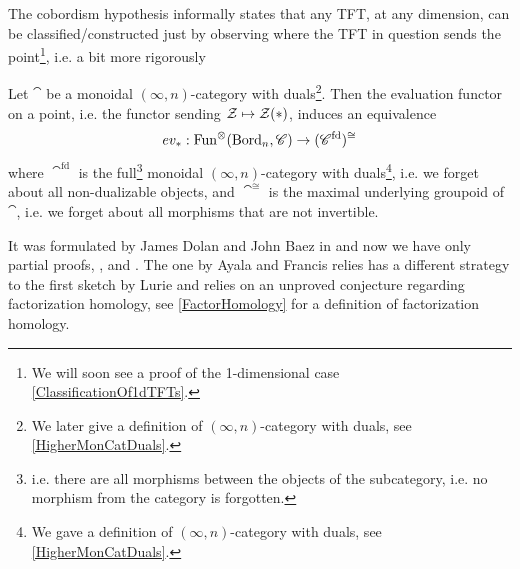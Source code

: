 \begin{rem}\label{RemarkOnCobHypo}
 The cobordism hypothesis informally states that any TFT, at any dimension, can be classified/constructed just by observing where the TFT in question sends the point\footnote{We will soon see a proof of the 1-dimensional case \ref{ClassificationOf1dTFTs}.}, i.e. a bit more rigorously
    \begin{thm}
        Let $\cat$ be a monoidal $(\infty,n)$-category with duals\footnote{We later give a definition of $(\infty,n)$-category with duals, see \ref{HigherMonCatDuals}.}. Then the evaluation functor on a point, i.e. the functor sending $\mathcal{Z}\mapsto \mathcal{Z}(\ast)$, induces an equivalence 
        $$ev_{\ast}:\operatorname{Fun}^{\otimes}(\operatorname{Bord}_{n},\mathscr{C})\to (\mathscr{C}^{\operatorname{fd}})^{\cong}$$
        where $\cat^{\operatorname{fd}}$ is the full\footnote{i.e. there are all morphisms between the objects of the subcategory, i.e. no morphism from the category is forgotten.} monoidal $(\infty,n)$-category with duals\footnote{We gave a definition of $(\infty,n)$-category with duals, see \ref{HigherMonCatDuals}.}, i.e. we
         forget about all non-dualizable objects, and $\cat^{\cong}$ is the maximal underlying groupoid of $\cat$, i.e. we
          forget about all morphisms that are not invertible.
    \end{thm}
    It was formulated by James Dolan and John Baez in \cite{Baez_1995} and now we have only partial proofs,
     \cite{lurie2009classification}, \cite{ayala2017cobordism} and \cite{grady2022geometric}. The one by Ayala and
      Francis relies has a different strategy to the first sketch by Lurie and relies on an unproved conjecture regarding
       factorization homology, see \ref{FactorHomology} for a definition of factorization homology.
    \end{rem}
